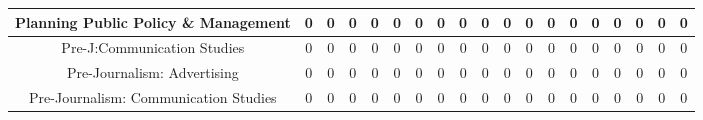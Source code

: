 \documentclass[10]{article}
\begin{document}
\begin{landscape}
\begin{longtable}[c]{|ccccccccccccccccccc|}
	\multicolumn{1}{|c|}{Planning Public Policy \& Management}       & \multicolumn{1}{c|}{0}          & \multicolumn{1}{c|}{0}          & \multicolumn{1}{c|}{0}          & \multicolumn{1}{c|}{0}          & \multicolumn{1}{c|}{0}          & \multicolumn{1}{c|}{0}          & \multicolumn{1}{c|}{0}          & \multicolumn{1}{c|}{0}          & \multicolumn{1}{c|}{0}          & \multicolumn{1}{c|}{0}          & \multicolumn{1}{c|}{0}          & \multicolumn{1}{c|}{0}          & \multicolumn{1}{c|}{0}          & \multicolumn{1}{c|}{0}          & \multicolumn{1}{c|}{0}          & \multicolumn{1}{c|}{0}          & \multicolumn{1}{c|}{0}          & 0          \\ \hline
	\multicolumn{1}{|c|}{Pre-J:Communication Studies}                & \multicolumn{1}{c|}{0}          & \multicolumn{1}{c|}{0}          & \multicolumn{1}{c|}{0}          & \multicolumn{1}{c|}{0}          & \multicolumn{1}{c|}{0}          & \multicolumn{1}{c|}{0}          & \multicolumn{1}{c|}{0}          & \multicolumn{1}{c|}{0}          & \multicolumn{1}{c|}{0}          & \multicolumn{1}{c|}{0}          & \multicolumn{1}{c|}{0}          & \multicolumn{1}{c|}{0}          & \multicolumn{1}{c|}{0}          & \multicolumn{1}{c|}{0}          & \multicolumn{1}{c|}{0}          & \multicolumn{1}{c|}{0}          & \multicolumn{1}{c|}{0}          & 0          \\ \hline
	\multicolumn{1}{|c|}{Pre-Journalism: Advertising}                & \multicolumn{1}{c|}{0}          & \multicolumn{1}{c|}{0}          & \multicolumn{1}{c|}{0}          & \multicolumn{1}{c|}{0}          & \multicolumn{1}{c|}{0}          & \multicolumn{1}{c|}{0}          & \multicolumn{1}{c|}{0}          & \multicolumn{1}{c|}{0}          & \multicolumn{1}{c|}{0}          & \multicolumn{1}{c|}{0}          & \multicolumn{1}{c|}{0}          & \multicolumn{1}{c|}{0}          & \multicolumn{1}{c|}{0}          & \multicolumn{1}{c|}{0}          & \multicolumn{1}{c|}{0}          & \multicolumn{1}{c|}{0}          & \multicolumn{1}{c|}{0}          & 0          \\ \hline
	\multicolumn{1}{|c|}{Pre-Journalism: Communication Studies}      & \multicolumn{1}{c|}{0}          & \multicolumn{1}{c|}{0}          & \multicolumn{1}{c|}{0}          & \multicolumn{1}{c|}{0}          & \multicolumn{1}{c|}{0}          & \multicolumn{1}{c|}{0}          & \multicolumn{1}{c|}{0}          & \multicolumn{1}{c|}{0}          & \multicolumn{1}{c|}{0}          & \multicolumn{1}{c|}{0}          & \multicolumn{1}{c|}{0}          & \multicolumn{1}{c|}{0}          & \multicolumn{1}{c|}{0}          & \multicolumn{1}{c|}{0}          & \multicolumn{1}{c|}{0}          & \multicolumn{1}{c|}{0}          & \multicolumn{1}{c|}{0}          & 0          \\ \hline

\end{longtable}
\end{landscape}
\end{document}
